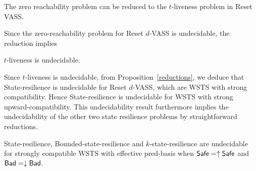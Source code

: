 \begin{theorem}\label{liveness reset}
The  zero reachability problem can be reduced to the $t$-liveness problem in Reset VASS.
\end{theorem}

\iffalse
\begin{proof}
See Appendix~\ref{appendix} for the complete proof.
\end{proof}
\fi

Since the zero-reachability problem for Reset $d$-VASS is undecidable, the reduction implies 
%
\iffalse
\begin{corollary}
Liveness is undecidable in Reset VASS.
\end{corollary}

Since moreover liveness can be reduced to 
$t$-liveness, we deduce:
\fi
%
{\sc %
$t$-liveness} is undecidable.





Since {\sc %
$t$-liveness} is undecidable, from Proposition~\ref{reductions},  we deduce that {\sc State-resilience} is undecidable  for Reset $d$-VASS, which are WSTS with strong compatibility. Hence {\sc State-resilience} is undecidable  for WSTS with strong upward-compatibility. This undecidability result furthermore implies the undecidability of the other two state resilience problems by straightforward reductions.


\begin{theorem}\label{srp up down}
{\sc State-resilience},
{\sc Bounded-state-resilience} and
{\sc $k$-state-resilience}
are undecidable for strongly compatible WSTS with effective pred-basis
when
$\textsf{Safe}=\uparrow \textsf{Safe}$
and $\textsf{Bad}=\downarrow \textsf{Bad}$.
\end{theorem}


